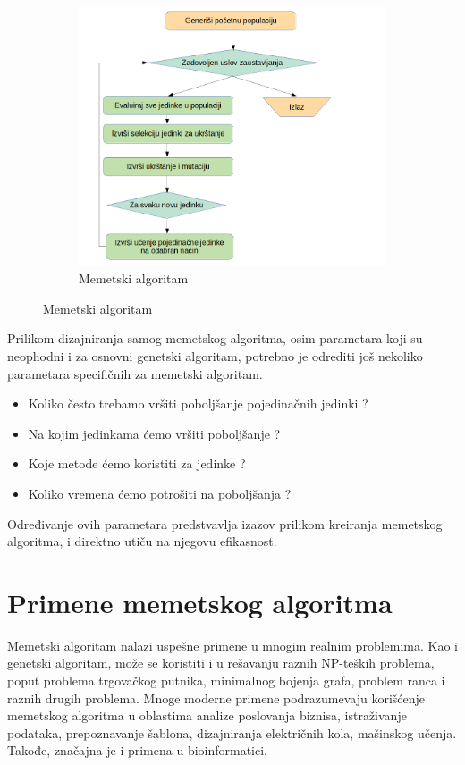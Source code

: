 \documentclass[a4paper]{article}
\begin{document}
\begin{figure}[h!]
    \centering

	\begin{subfigure}[normla]{0.3\textwidth}
		\hspace*{-1cm}\includegraphics[scale=0.3]{slike/memeticdrawcrop.png}
		{\caption*{Memetski algoritam}}
		\label{memeticdrawcrop}
	\end{subfigure}
\label{memeticdrawcrop.png}
\end{figure}

Prilikom dizajniranja samog memetskog algoritma, osim parametara koji su neophodni i za osnovni genetski algoritam, potrebno je odrediti još nekoliko parametara specifičnih za memetski algoritam. 

\begin{itemize}
  \item Koliko često trebamo vršiti poboljšanje pojedinačnih jedinki ?
  \item Na kojim jedinkama ćemo vršiti poboljšanje ?
  \item Koje metode ćemo koristiti za jedinke ?
  \item Koliko vremena ćemo potrošiti na poboljšanja ? 
\end{itemize}

Određivanje ovih parametara predstvavlja izazov prilikom kreiranja memetskog algoritma, i direktno utiču na njegovu efikasnost. 


\section{Primene memetskog algoritma}
\label{sec:primene_memetskog_algoritma}
Memetski algoritam nalazi uspešne primene u mnogim realnim problemima. Kao i genetski algoritam, može se koristiti i u rešavanju raznih NP-teških problema, poput problema trgovačkog putnika, minimalnog bojenja grafa, problem ranca i raznih drugih problema. 
Mnoge moderne primene podrazumevaju korišćenje memetskog algoritma u oblastima analize poslovanja biznisa, istraživanje podataka, prepoznavanje šablona, dizajniranja električnih kola, mašinskog učenja. Takođe, značajna je i primena u bioinformatici. 
\end{document}
